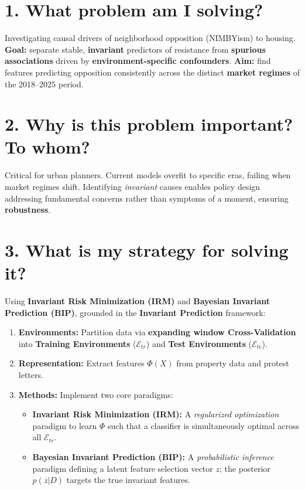\documentclass[11pt]{article}
\begin{document}
\section*{1. What problem am I solving?}
Investigating causal drivers of neighborhood opposition (NIMBYism) to housing. \textbf{Goal:} separate stable, \textbf{invariant} predictors of resistance from \textbf{spurious associations} driven by \textbf{environment-specific confounders}. \textbf{Aim:} find features predicting opposition consistently across the distinct \textbf{market regimes} of the 2018--2025 period.

\section*{2. Why is this problem important? To whom?}
Critical for urban planners. Current models overfit to specific eras, failing when market regimes shift. Identifying \textit{invariant} causes enables policy design addressing fundamental concerns rather than symptoms of a moment, ensuring \textbf{robustness}.

\section*{3. What is my strategy for solving it?}
Using \textbf{Invariant Risk Minimization (IRM)} and \textbf{Bayesian Invariant Prediction (BIP)}, grounded in the \textbf{Invariant Prediction} framework:
\begin{enumerate}
    \setlength\itemsep{-0.3em}
    \item \textbf{Environments:} Partition data via \textbf{expanding window Cross-Validation} into \textbf{Training Environments} ($\mathcal{E}_{tr}$) and \textbf{Test Environments} ($\mathcal{E}_{te}$).
    \item \textbf{Representation:} Extract features $\Phi(X)$ from property data and protest letters.
    \item \textbf{Methods:} Implement two core paradigms:
    \begin{itemize}
        \item \textbf{Invariant Risk Minimization (IRM):} A \textit{regularized optimization} paradigm to learn $\Phi$ such that a classifier is simultaneously optimal across all $\mathcal{E}_{tr}$.
        \item \textbf{Bayesian Invariant Prediction (BIP):} A \textit{probabilistic inference} paradigm defining a latent feature selection vector $z$; the posterior $p(z|D)$ targets the true invariant features.
    \end{itemize}
\end{enumerate}
\end{document}
